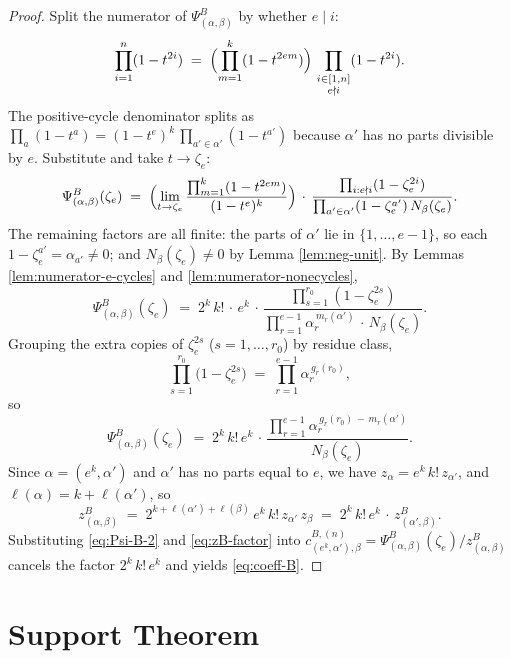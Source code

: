 \documentclass[11pt]{article}
\theoremstyle{remark}
\newcommand{\zetae}{\zeta_e}
\newcommand{\PsiB}{\Psi^{B}}
\newcommand{\zB}{z^{B}}
\begin{document}
\begin{proof}
Split the numerator of $\PsiB_{(\alpha, \beta)}$ by whether $e \mid i$:
\[
  \prod_{i=1}^n(1 - t^{2i}) \;=\; \Bigl(\prod_{m=1}^{k}(1 - t^{2em})\Bigr)\, \prod_{\substack{i \in [1,n] \\ e \nmid i}}(1 - t^{2i}).
\]
The positive-cycle denominator splits as $\prod_a(1 - t^a) = (1 - t^e)^{k}\, \prod_{a' \in \alpha'}(1 - t^{a'})$ because $\alpha'$ has no parts divisible by $e$. Substitute and take $t \to \zetae$:
\[
  \PsiB_{(\alpha, \beta)}(\zetae)
  \;=\; \Bigl(\lim_{t \to \zetae}\frac{\prod_{m=1}^{k}(1 - t^{2em})}{(1 - t^e)^{k}}\Bigr)\, \cdot\, \frac{\prod_{i:e \nmid i}(1 - \zetae^{2i})}{\prod_{a' \in \alpha'}(1 - \zetae^{a'})\, N_\beta(\zetae)}.
\]
The remaining factors are all finite: the parts of $\alpha'$ lie in $\{1, \ldots, e-1\}$, so each $1 - \zetae^{a'} = \alpha_{a'} \ne 0$; and $N_\beta(\zetae) \ne 0$ by Lemma \ref{lem:neg-unit}. By Lemmas \ref{lem:numerator-e-cycles} and \ref{lem:numerator-nonecycles},
\begin{equation}\label{eq:Psi-B}
  \PsiB_{(\alpha, \beta)}(\zetae)
  \;=\; 2^{k}\, k!\, \cdot\, e^{k}\, \cdot\, \frac{\prod_{s=1}^{r_0}(1 - \zetae^{2s})}{\prod_{r=1}^{e-1}\alpha_r^{\,m_r(\alpha')}\, \cdot\, N_\beta(\zetae)}.
\end{equation}
Grouping the extra copies of $\zetae^{2s}$ ($s = 1, \ldots, r_0$) by residue class,
\[
  \prod_{s=1}^{r_0}\bigl(1 - \zetae^{2s}\bigr) \;=\; \prod_{r=1}^{e-1} \alpha_r^{\,g_r(r_0)},
\]
so
\begin{equation}\label{eq:Psi-B-2}
  \PsiB_{(\alpha, \beta)}(\zetae) \;=\; 2^{k}\, k!\, e^{k}\, \cdot\, \frac{\prod_{r=1}^{e-1} \alpha_r^{\,g_r(r_0)\, -\, m_r(\alpha')}}{N_\beta(\zetae)}.
\end{equation}
Since $\alpha = (e^{k}, \alpha')$ and $\alpha'$ has no parts equal to $e$, we have $z_\alpha = e^{k}\, k!\, z_{\alpha'}$, and $\ell(\alpha) = k + \ell(\alpha')$, so
\begin{equation}\label{eq:zB-factor}
  \zB_{(\alpha, \beta)} \;=\; 2^{k + \ell(\alpha') + \ell(\beta)}\, e^{k}\, k!\, z_{\alpha'}\, z_\beta
  \;=\; 2^{k}\, k!\, e^{k}\, \cdot\, \zB_{(\alpha', \beta)}.
\end{equation}
Substituting \eqref{eq:Psi-B-2} and \eqref{eq:zB-factor} into $c^{B, (n)}_{(e^{k}, \alpha'), \beta} = \PsiB_{(\alpha, \beta)}(\zetae)/\zB_{(\alpha, \beta)}$ cancels the factor $2^{k}\, k!\, e^{k}$ and yields \eqref{eq:coeff-B}.
\end{proof}

\section{Support Theorem}
\end{document}
